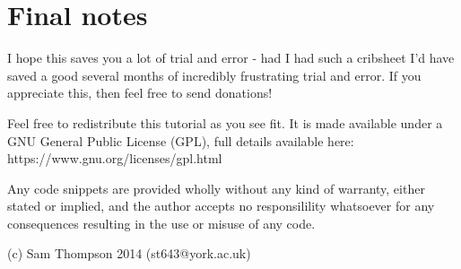 \documentclass[12pt,a4paper]{article}
\begin{document}
\section{Final notes}

I hope this saves you a lot of trial and error - had I had such a cribsheet I'd have saved a good several months of incredibly frustrating trial and error. If you appreciate this, then feel free to send donations!

Feel free to redistribute this tutorial as you see fit. It is made available under a GNU General Public License (GPL), full details available here: https://www.gnu.org/licenses/gpl.html

Any code snippets are provided wholly without any kind of warranty, either stated or implied, and the author accepts no responsilility whatsoever for any consequences resulting in the use or misuse of any code.

(c) Sam Thompson 2014 (st643@york.ac.uk)
\end{document}

